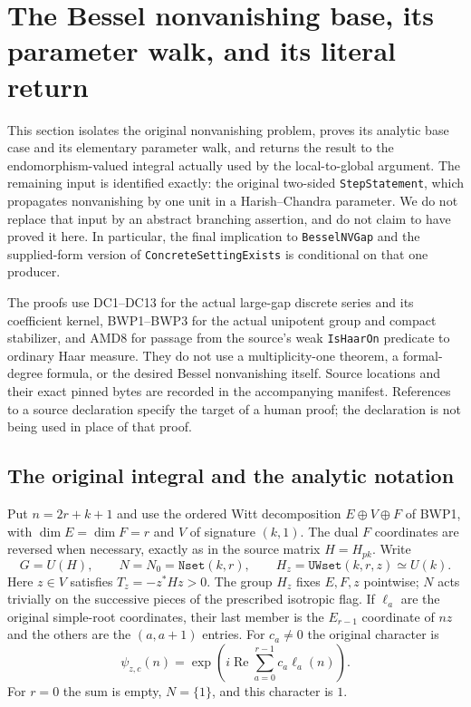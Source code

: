 \documentclass[11pt,a4paper]{article}
\numberwithin{equation}{section}
\theoremstyle{remark}\newtheorem{remark}[theorem]{Remark}
\begin{document}
\section{The Bessel nonvanishing base, its parameter walk, and its literal return}
\label{sec:bessel-nonvanishing-v50}

This section isolates the original nonvanishing problem, proves its analytic
base case and its elementary parameter walk, and returns the result to the
endomorphism-valued integral actually used by the local-to-global argument.
The remaining input is identified exactly: the original two-sided
\texttt{Step\allowbreak Statement}, which propagates nonvanishing by one unit in a
Harish--Chandra parameter.  We do not replace that input by an abstract
branching assertion, and do not claim to have proved it here.  In particular,
the final implication to \texttt{Bessel\allowbreak NVGap} and the supplied-form version of
\texttt{Concrete\allowbreak Setting\allowbreak Exists} is conditional on that one producer.

The proofs use DC1--DC13 for the actual large-gap discrete series and its
coefficient kernel, BWP1--BWP3 for the actual unipotent group and compact
stabilizer, and AMD8 for passage from the source's weak \texttt{Is\allowbreak Haar\allowbreak On}
predicate to ordinary Haar measure.  They do not use a multiplicity-one
theorem, a formal-degree formula, or the desired Bessel nonvanishing itself.
Source locations and their exact pinned bytes are recorded in the accompanying
manifest.  References to a source declaration specify the target of a human
proof; the declaration is not being used in place of that proof.

\subsection{The original integral and the analytic notation}

Put $n=2r+k+1$ and use the ordered Witt decomposition
$E\oplus V\oplus F$ of BWP1, with $\dim E=\dim F=r$ and $V$ of signature
$(k,1)$.  The dual $F$ coordinates are reversed when necessary, exactly as in
the source matrix $H=H_{pk}$.  Write
\[
 G=U(H),\qquad N=N_0=\texttt{Nset}(k,r),\qquad
 H_z=\texttt{UWset}(k,r,z)\simeq U(k).
\]
Here $z\in V$ satisfies $T_z=-z^*Hz>0$.  The group $H_z$ fixes $E,F,z$
pointwise; $N$ acts trivially on the successive pieces of the prescribed
isotropic flag.  If $\ell_a$ are the original simple-root coordinates, their
last member is the $E_{r-1}$ coordinate of $nz$ and the others are the
$(a,a+1)$ entries.  For $c_a\ne0$ the original character is
\[
 \psi_{z,c}(n)=
 \exp\left(i\operatorname{Re}\sum_{a=0}^{r-1}c_a\ell_a(n)\right).
 \tag{BNV.1}
\]
For $r=0$ the sum is empty, $N=\{1\}$, and this character is $1$.
\end{document}
